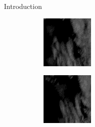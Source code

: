 \documentclass{beamer}
\begin{document}
\begin{frame}{Introduction}
\begin{figure}
\begin{subfigure}{.3\textwidth}
	        \includegraphics[width=\linewidth]{fig/radarcs1801030510.png}
	    \end{subfigure}
	    \begin{subfigure}{.3\textwidth}
	        \centering
	        \includegraphics[width=\linewidth]{fig/radarcs1801030520.png}
	    \end{subfigure}
	\end{figure}


\end{frame}
\end{document}
